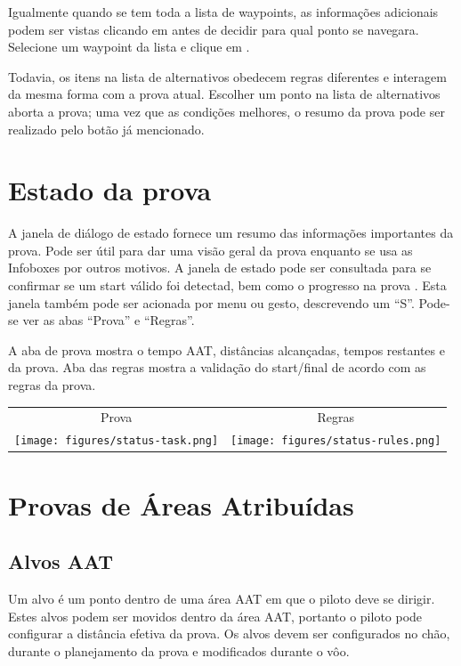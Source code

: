 Igualmente quando se tem toda a lista de waypoints, as informações adicionais podem ser vistas clicando em  antes de decidir para qual ponto se navegara.  Selecione um waypoint da lista e clique em .

Todavia, os itens na lista de alternativos obedecem regras diferentes e interagem da mesma forma com a prova atual.  Escolher um ponto na lista de alternativos aborta a prova; uma vez que as condições melhores, o resumo da prova pode ser realizado pelo botão já mencionado.


\section{Estado da prova }\label{sec:task-status}

A janela de diálogo de estado fornece um resumo das informações importantes da prova.   
 Pode ser útil para dar uma visão geral da prova enquanto se usa as Infoboxes por outros motivos.  A janela de estado pode ser consultada para se confirmar se um start válido foi detectad, bem como o progresso na prova
.  Esta janela também pode ser acionada por menu ou gesto, descrevendo um “S”.   Pode-se ver as abas “Prova” e “Regras”.

A aba de prova mostra o tempo AAT, distâncias alcançadas, tempos restantes e da prova.  Aba das regras mostra a validação do start/final de acordo com as regras da prova.

\begin{center}
\begin{tabular}{c c}
Prova & Regras \\
\texttt{[image: figures/status-task.png]} &
\texttt{[image: figures/status-rules.png]} \\
\end{tabular}
\end{center}

\section{Provas de Áreas Atribuídas}\label{sec:aat-tasks}

\subsection*{Alvos AAT}

Um alvo é um ponto dentro de uma área AAT em que o piloto deve se dirigir.  Estes alvos podem ser movidos dentro da área AAT, portanto o piloto pode configurar a distância efetiva da prova.  Os alvos devem ser configurados no chão, durante o planejamento da prova e modificados durante o vôo.

